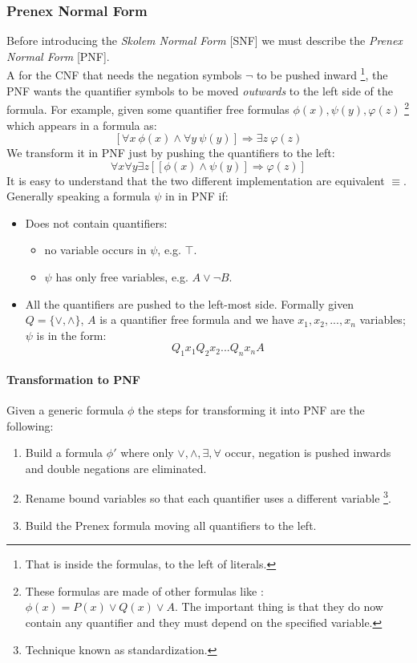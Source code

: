 \documentclass[10pt,a4paper]{article}
\begin{document}
\begin{itemize}
\subsubsection{Prenex Normal Form}
Before introducing the \textit{Skolem Normal Form} [SNF] we must describe the \textit{Prenex Normal Form} [PNF].\\
A for the CNF that needs the negation symbols $\neg$ to be pushed inward \footnote{That is inside the formulas, to the left of literals.}, the PNF wants the quantifier symbols to be moved \textit{outwards} to the left side of the formula. For example, given some quantifier free formulas $\phi(x),\psi(y),\varphi(z)$ \footnote{These formulas are made of other formulas like : $\phi(x)=P(x)\vee Q(x)\vee A$. The important thing is that they do now contain any quantifier and they must depend on the specified variable.  } which appears in a formula as:
\[[\forall x\ \phi(x) \wedge \forall y\ \psi(y)] \Rightarrow \exists z\ \varphi(z)\]
We transform it in PNF just by pushing the quantifiers to the left:
\[\forall x\forall y\exists z[[\phi(x) \wedge \psi(y)] \Rightarrow \varphi(z)]\]
It is easy to understand that the two different implementation are equivalent $\equiv$.\\

Generally speaking a formula $\psi$ in in PNF if:
\begin{itemize}
\item Does not contain quantifiers:
	\begin{itemize}
	\item no variable occurs in $\psi$, e.g. $\top$.
	\item $\psi$ has only free variables, e.g.  $A\vee \neg B$.
	\end{itemize}
\item All the quantifiers are pushed to the left-most side. Formally given $Q=\lbrace \vee, \wedge \rbrace$, $A$ is a quantifier free formula and we have $x_1,x_2,...,x_n$ variables; $\psi$ is in the form:
\[Q_1x_1Q_2x_2...Q_nx_nA\]

\end{itemize}

\paragraph{Transformation to PNF}
Given a generic formula $\phi$ the steps for transforming it into PNF are the following:
\begin{enumerate}
\item Build a formula $\phi'$  where only $\vee, \wedge, \exists, \forall$ occur,  negation is pushed inwards and double negations are eliminated.
\item Rename bound variables so that each quantifier uses a different variable \footnote{Technique known as standardization.}.
\item Build the Prenex formula moving all quantifiers to the left.
\end{enumerate}




\end{itemize}
\end{document}
